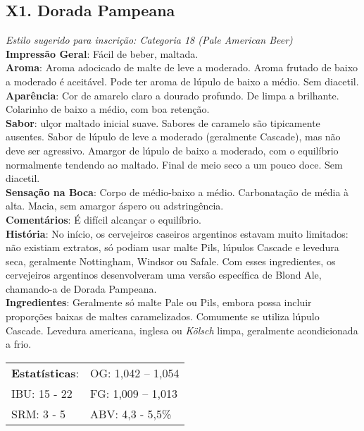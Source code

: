 \subsection*{X1. Dorada Pampeana}

\textit{Estilo sugerido para inscrição: Categoria 18 (Pale American Beer)}\\
\textbf{Impressão Geral}: Fácil de beber, maltada. \\
\textbf{Aroma}: Aroma adocicado de malte de leve a moderado. Aroma frutado de baixo a moderado é aceitável. Pode ter aroma de lúpulo de baixo a médio. Sem diacetil. \\
\textbf{Aparência}: Cor de amarelo claro a dourado profundo. De limpa a brilhante. Colarinho de baixo a médio, com boa retenção. \\
\textbf{Sabor}: ulçor maltado inicial suave. Sabores de caramelo são tipicamente ausentes. Sabor de lúpulo de leve a moderado (geralmente Cascade), mas não deve ser agressivo. Amargor de lúpulo de baixo a moderado, com o equilíbrio normalmente tendendo ao maltado. Final de meio seco a um pouco doce. Sem diacetil. \\
\textbf{Sensação na Boca}: Corpo de médio-baixo a médio. Carbonatação de média à alta. Macia, sem amargor áspero ou adstringência. \\
\textbf{Comentários}: É difícil alcançar o equilíbrio. \\
\textbf{História}: No início, os cervejeiros caseiros argentinos estavam muito limitados: não existiam extratos, só podiam usar malte Pils, lúpulos Cascade e levedura seca, geralmente Nottingham, Windsor ou Safale. Com esses ingredientes, os cervejeiros argentinos desenvolveram uma versão específica de Blond Ale, chamando-a de Dorada Pampeana. \\
\textbf{Ingredientes}: Geralmente só malte Pale ou Pils, embora possa incluir proporções baixas de maltes caramelizados. Comumente se utiliza lúpulo Cascade. Levedura americana, inglesa ou \textit{Kölsch} limpa, geralmente acondicionada a frio. \\
\begin{tabular}{@{}p{35mm}p{35mm}@{}}
  \textbf{Estatísticas}: & OG: 1,042 – 1,054 \\
  IBU: 15 - 22 & FG: 1,009 – 1,013 \\
  SRM: 3 - 5 & ABV: 4,3 - 5,5\%
\end{tabular}